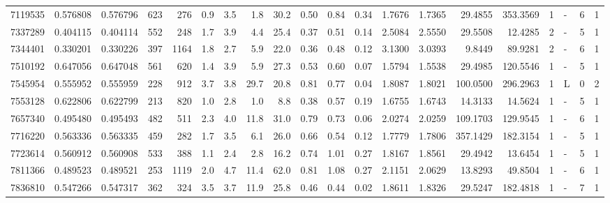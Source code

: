 \begin{tabular}{rrrrrrrrrrrrrrrrrlrl}
   7119535 & 0.576808 & 0.576796 &  623 &  276 &      0.9 &      3.5 &     1.8 &    30.2 &   0.50 &   0.84 &       0.34 &  1.7676 &  1.7365 &   29.4855 &  353.3569 &       1 &             - &        6 &         1 \\
   7337289 & 0.404115 & 0.404114 &  552 &  248 &      1.7 &      3.9 &     4.4 &    25.4 &   0.37 &   0.51 &       0.14 &  2.5084 &  2.5550 &   29.5508 &   12.4285 &       2 &             - &        5 &         1 \\
   7344401 & 0.330201 & 0.330226 &  397 & 1164 &      1.8 &      2.7 &     5.9 &    22.0 &   0.36 &   0.48 &       0.12 &  3.1300 &  3.0393 &    9.8449 &   89.9281 &       2 &             - &        6 &         1 \\
   7510192 & 0.647056 & 0.647048 &  561 &  620 &      1.4 &      3.9 &     5.9 &    27.3 &   0.53 &   0.60 &       0.07 &  1.5794 &  1.5538 &   29.4985 &  120.5546 &       1 &             - &        5 &         1 \\
   7545954 & 0.555952 & 0.555959 &  228 &  912 &      3.7 &      3.8 &    29.7 &    20.8 &   0.81 &   0.77 &       0.04 &  1.8087 &  1.8021 &  100.0500 &  296.2963 &       1 &             L &        0 &         2 \\
   7553128 & 0.622806 & 0.622799 &  213 &  820 &      1.0 &      2.8 &     1.0 &     8.8 &   0.38 &   0.57 &       0.19 &  1.6755 &  1.6743 &   14.3133 &   14.5624 &       1 &             - &        5 &         1 \\
   7657340 & 0.495480 & 0.495493 &  482 &  511 &      2.3 &      4.0 &    11.8 &    31.0 &   0.79 &   0.73 &       0.06 &  2.0274 &  2.0259 &  109.1703 &  129.9545 &       1 &             - &        6 &         1 \\
   7716220 & 0.563336 & 0.563335 &  459 &  282 &      1.7 &      3.5 &     6.1 &    26.0 &   0.66 &   0.54 &       0.12 &  1.7779 &  1.7806 &  357.1429 &  182.3154 &       1 &             - &        5 &         1 \\
   7723614 & 0.560912 & 0.560908 &  533 &  388 &      1.1 &      2.4 &     2.8 &    16.2 &   0.74 &   1.01 &       0.27 &  1.8167 &  1.8561 &   29.4942 &   13.6454 &       1 &             - &        5 &         1 \\
   7811366 & 0.489523 & 0.489521 &  253 & 1119 &      2.0 &      4.7 &    11.4 &    62.0 &   0.81 &   1.08 &       0.27 &  2.1151 &  2.0629 &   13.8293 &   49.8504 &       1 &             - &        6 &         1 \\
   7836810 & 0.547266 & 0.547317 &  362 &  324 &      3.5 &      3.7 &    11.9 &    25.8 &   0.46 &   0.44 &       0.02 &  1.8611 &  1.8326 &   29.5247 &  182.4818 &       1 &             - &        7 &         1 \\

\end{tabular}
